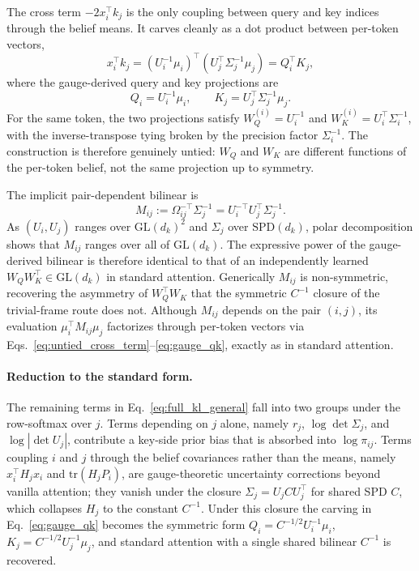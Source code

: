 \documentclass[11pt]{article}
\begin{document}
The cross term $-2x_i^\top k_j$ is the only coupling between query and key indices through the belief means. It carves cleanly as a dot product between per-token vectors,
\begin{equation}
x_i^\top k_j = (U_i^{-1}\mu_i)^\top (U_j^\top \Sigma_j^{-1}\mu_j) = Q_i^\top K_j,
\label{eq:untied_cross_term}
\end{equation}
where the gauge-derived query and key projections are
\begin{equation}
\boxed{Q_i = U_i^{-1}\mu_i, \qquad K_j = U_j^\top \Sigma_j^{-1}\mu_j.}
\label{eq:gauge_qk}
\end{equation}
For the same token, the two projections satisfy $W_Q^{(i)} = U_i^{-1}$ and $W_K^{(i)} = U_i^\top \Sigma_i^{-1}$, with the inverse-transpose tying broken by the precision factor $\Sigma_i^{-1}$. The construction is therefore genuinely untied: $W_Q$ and $W_K$ are different functions of the per-token belief, not the same projection up to symmetry.

The implicit pair-dependent bilinear is
\begin{equation}
M_{ij} := \Omega_{ij}^{-\top}\Sigma_j^{-1} = U_i^{-\top} U_j^\top \Sigma_j^{-1}.
\label{eq:gauge_bilinear}
\end{equation}
As $(U_i, U_j)$ ranges over $\mathrm{GL}(d_k)^2$ and $\Sigma_j$ over $\mathrm{SPD}(d_k)$, polar decomposition shows that $M_{ij}$ ranges over all of $\mathrm{GL}(d_k)$. The expressive power of the gauge-derived bilinear is therefore identical to that of an independently learned $W_Q W_K^\top \in \mathrm{GL}(d_k)$ in standard attention. Generically $M_{ij}$ is non-symmetric, recovering the asymmetry of $W_Q^\top W_K$ that the symmetric $C^{-1}$ closure of the trivial-frame route does not. Although $M_{ij}$ depends on the pair $(i,j)$, its evaluation $\mu_i^\top M_{ij}\mu_j$ factorizes through per-token vectors via Eqs.~\eqref{eq:untied_cross_term}--\eqref{eq:gauge_qk}, exactly as in standard attention.

\paragraph{Reduction to the standard form.}
The remaining terms in Eq.~\eqref{eq:full_kl_general} fall into two groups under the row-softmax over $j$. Terms depending on $j$ alone, namely $r_j$, $\log\det\Sigma_j$, and $\log|\det U_j|$, contribute a key-side prior bias that is absorbed into $\log\pi_{ij}$. Terms coupling $i$ and $j$ through the belief covariances rather than the means, namely $x_i^\top H_j x_i$ and $\mathrm{tr}(H_j P_i)$, are gauge-theoretic uncertainty corrections beyond vanilla attention; they vanish under the closure $\Sigma_j = U_j C U_j^\top$ for shared SPD $C$, which collapses $H_j$ to the constant $C^{-1}$. Under this closure the carving in Eq.~\eqref{eq:gauge_qk} becomes the symmetric form $Q_i = C^{-1/2}U_i^{-1}\mu_i$, $K_j = C^{-1/2}U_j^{-1}\mu_j$, and standard attention with a single shared bilinear $C^{-1}$ is recovered.
\end{document}

